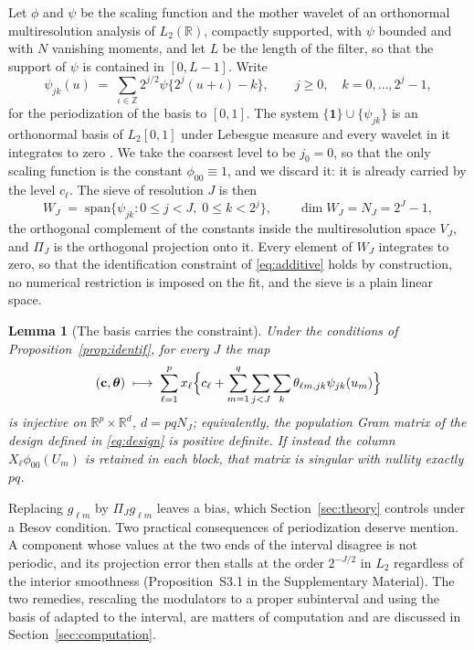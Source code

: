 \documentclass[12pt]{article} %
\newtheorem{lemma}{Lemma}
\theoremstyle{definition}
\newcommand{\R}{\mathbb{R}}
\newcommand{\cv}{\ell}
\newcommand{\md}{m}
\newcommand{\lev}{j}
\newcommand{\tsl}{k}
\newcommand{\jzero}{j_{0}}
\newcommand{\NJ}{N_{J}}
\newcommand{\lvl}[1]{c_{#1}}
\newcommand{\gcomp}[2]{g_{#1#2}}
\newcommand{\wav}[2]{\psi_{#1#2}}
\newcommand{\VJ}{V_{J}}
\newcommand{\WJ}{W_{J}}
\newcommand{\PiJ}{\Pi_{J}}
\newcommand{\coef}[4]{\theta_{#1#2,#3#4}}
\newcommand{\btheta}{\boldsymbol{\theta}}
\newcommand{\bc}{\mathbf{c}}
\begin{document}
Let $\phi$ and $\psi$ be the scaling function and the mother wavelet of an
orthonormal multiresolution analysis of $L_2(\R)$, compactly supported, with
$\psi$ bounded and with $N$ vanishing moments, and let $L$ be the length of
the filter, so that the support of $\psi$ is contained in $[0,L-1]$. Write
\begin{equation}
  \label{eq:periodized}
  \wav{\lev}{\tsl}(u) \;=\; \sum_{\iota \in \mathbb{Z}}
  2^{\lev/2}\psi\{2^{\lev}(u+\iota) - \tsl\},
  \qquad \lev \ge 0, \quad \tsl = 0,\dots,2^{\lev}-1,
\end{equation}
for the periodization of the basis to $[0,1]$. The system
$\{\mathbf{1}\}\cup\{\wav{\lev}{\tsl}\}$ is an orthonormal basis of
$L_2[0,1]$ under Lebesgue measure and every wavelet in it integrates to zero
\citep[Section 9.3]{Daubechies-1992}. We take the coarsest level to be
$\jzero = 0$, so that the only scaling function is the constant
$\phi_{00}\equiv 1$, and we discard it: it is already carried by the level
$\lvl{\cv}$. The sieve of resolution $J$ is then
\[
  \WJ \;=\; \mathrm{span}\{\wav{\lev}{\tsl} : 0 \le \lev < J,\;
  0 \le \tsl < 2^{\lev}\},
  \qquad \dim \WJ = \NJ = 2^{J}-1,
\]
the orthogonal complement of the constants inside the multiresolution space
$\VJ$, and $\PiJ$ is the orthogonal projection onto it. Every element of $\WJ$
integrates to zero, so that the identification constraint of
\eqref{eq:additive} holds by construction, no numerical restriction is imposed
on the fit, and the sieve is a plain linear space.

\begin{lemma}[The basis carries the constraint]
\label{lem:basis}
Under the conditions of Proposition~\ref{prop:identif}, for every $J$ the map
\[
  (\bc, \btheta) \;\longmapsto\;
  \sum_{\cv=1}^{p} x_{\cv}\Bigl\{\lvl{\cv} + \sum_{\md=1}^{q}
  \sum_{\lev<J}\sum_{\tsl} \coef{\cv}{\md}{\lev}{\tsl}
  \wav{\lev}{\tsl}(u_{\md})\Bigr\}
\]
is injective on $\R^{p}\times\R^{d}$, $d = pq\NJ$; equivalently, the
population Gram matrix of the design defined in \eqref{eq:design} is positive
definite. If instead the column $X_{\cv}\phi_{00}(U_{\md})$ is retained in
each block, that matrix is singular with nullity exactly $pq$.
\end{lemma}

Replacing $\gcomp{\cv}{\md}$ by $\PiJ\gcomp{\cv}{\md}$ leaves a bias, which
Section~\ref{sec:theory} controls under a Besov condition. Two practical
consequences of periodization deserve mention. A component whose values at the
two ends of the interval disagree is not periodic, and its projection error
then stalls at the order $2^{-J/2}$ in $L_2$ regardless of the interior
smoothness (Proposition~S3.1 in the Supplementary Material). The two remedies,
rescaling the modulators to a proper subinterval and using the basis of
\citet*{cohen1993wavelets} adapted to the interval, are matters of computation
and are discussed in Section~\ref{sec:computation}.
\end{document}
